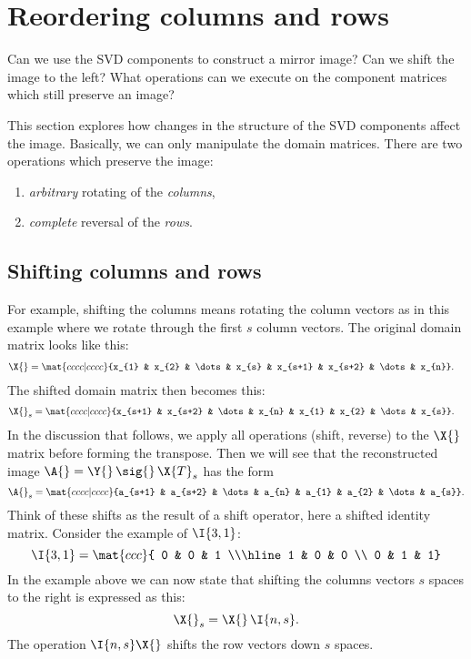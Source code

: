 \clearpage
\break

\section{Reordering columns and rows}
Can we use the SVD components to construct a mirror image? Can we shift the image to the left? What operations can we execute on the component matrices which still preserve an image?

This section explores how changes in the structure of the SVD components affect the image. Basically, we can only manipulate the domain matrices. There are two operations which preserve the image:
\begin{enumerate}
\item \emph{arbitrary} rotating of the \emph{columns},
\item \emph{complete} reversal of the \emph{rows}.
\end{enumerate}

\subsection{Shifting columns and rows}
For example, shifting the columns means rotating the column vectors as in this example where we rotate through the first $s$ column vectors. The original domain matrix looks like this:
\begin{equation}
  \begin{split}
    \X{} & = \mat{cccc|cccc}{x_{1} & x_{2} & \dots & x_{s} & x_{s+1} & x_{s+2} & \dots & x_{n}} .
  \end{split}
\end{equation}
The shifted domain matrix then becomes this:
\begin{equation}
  \begin{split}
    \X{}_{s} & = \mat{cccc|cccc}{x_{s+1} & x_{s+2} & \dots & x_{n} & x_{1} & x_{2} & \dots & x_{s}} .  
  \end{split}
\end{equation}
In the discussion that follows, we apply all operations (shift, reverse) to the $\X{}$ matrix before forming the transpose. Then we will see that the reconstructed image $\A{} = \Y{} \, \sig{} \, \X{T}_{s}$ has the form
\begin{equation}
  \A{}_{s} = \mat{cccc|cccc}{a_{s+1} & a_{s+2} & \dots & a_{n} & a_{1} & a_{2} & \dots & a_{s}}.
\end{equation}
Think of these shifts as the result of a shift operator, here a shifted identity matrix. Consider the example of $\I{3,1}$:
\begin{equation}
  \I{3,1} = \mat{ccc}{
  0 & 0 & 1 \\\hline
  1 & 0 & 0 \\
  0 & 1 & 1}
\end{equation}
In the example above we can now state that shifting the columns vectors $s$ spaces to the right is expressed as this:
\begin{equation}
  \X{}_{s} = \X{}\,\I{n,s}.
\end{equation}
The operation $\I{n,s}\X{}$ shifts the row vectors down $s$ spaces.

